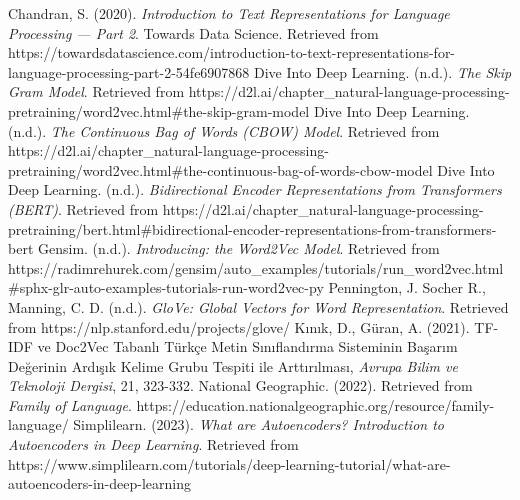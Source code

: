 \documentclass[man]{apa7}
\begin{document}
\begin{thebibliography}{7}
Chandran, S. (2020). \emph{Introduction to Text Representations for Language Processing — Part 2}. Towards Data Science. Retrieved from https://towardsdatascience.com/introduction-to-text-representations-for-language-processing-part-2-54fe6907868
Dive Into Deep Learning. (n.d.). \emph{The Skip Gram Model}. Retrieved from https://d2l.ai/chapter\_natural-language-processing-pretraining/word2vec.html\#the-skip-gram-model
Dive Into Deep Learning. (n.d.). \emph{The Continuous Bag of Words (CBOW) Model}. Retrieved from https://d2l.ai/chapter\_natural-language-processing-pretraining/word2vec.html\#the-continuous-bag-of-words-cbow-model
Dive Into Deep Learning. (n.d.). \emph{Bidirectional Encoder Representations from Transformers (BERT)}. Retrieved from https://d2l.ai/chapter\_natural-language-processing-pretraining/bert.html\#bidirectional-encoder-representations-from-transformers-bert
Gensim. (n.d.). \emph{Introducing: the Word2Vec Model}. Retrieved from
https://radimrehurek.com/gensim/auto\_examples/tutorials/run\_word2vec.html\#sphx-glr-auto-examples-tutorials-run-word2vec-py
Pennington, J. Socher R., Manning, C. D. (n.d.). \emph{GloVe: Global Vectors for Word Representation}. Retrieved from https://nlp.stanford.edu/projects/glove/
Kınık, D., Güran, A. (2021). TF-IDF ve Doc2Vec Tabanlı Türkçe Metin Sınıflandırma Sisteminin
Başarım Değerinin Ardışık Kelime Grubu Tespiti ile Arttırılması, \emph{Avrupa Bilim ve Teknoloji Dergisi}, 21, 323-332.
National Geographic. (2022). Retrieved from \emph{Family of Language}. https://education.nationalgeographic.org/resource/family-language/
Simplilearn. (2023). \emph{What are Autoencoders? Introduction to Autoencoders in Deep Learning}. Retrieved from https://www.simplilearn.com/tutorials/deep-learning-tutorial/what-are-autoencoders-in-deep-learning
\end{thebibliography}
\end{document}
